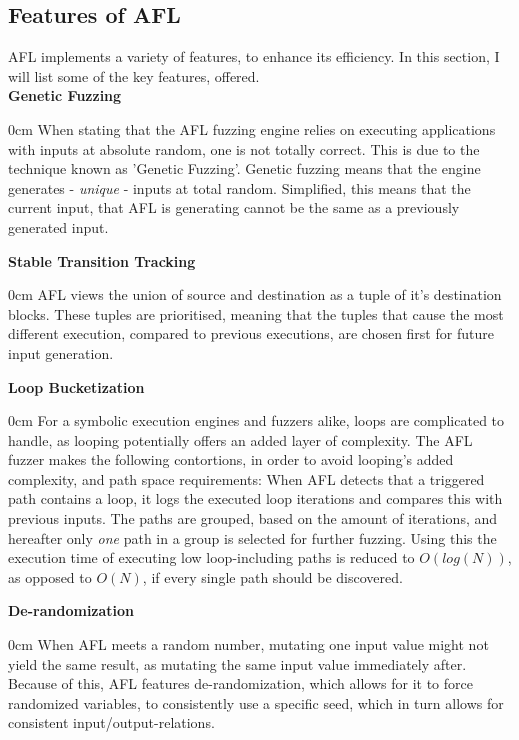 \documentclass[a4paper]{article}
\newcommand{\tbf}[1]{\textbf{#1}}
\newcommand{\tit}[1]{\textit{#1}}
\newcommand{\marginwidth}{0.5cm}
\newcommand{\subsubsubsection}[1]{\tbf{#1}\begin{addmargin}[\marginwidth]{0cm}}
\begin{document}
\subsection{Features of AFL}
\label{sec:FeaturesAFL}
AFL implements a variety of features, to enhance its efficiency. In this section, I will list some of the key features, offered.\\
\subsubsubsection{Genetic Fuzzing}
When stating that the AFL fuzzing engine relies on executing applications with inputs at absolute random, one is not totally correct. This is due to the technique known as 'Genetic Fuzzing'. Genetic fuzzing means that the engine generates - \tit{unique} - inputs at total random. Simplified, this means that the current input, that AFL is generating cannot be the same as a previously generated input.
\end{addmargin}
\subsubsubsection{Stable Transition Tracking}
AFL views the union of source and destination as a tuple of it's destination blocks. These tuples are prioritised, meaning that the tuples that cause the most different execution, compared to previous executions, are chosen first for future input generation.
\end{addmargin}
\subsubsubsection{Loop Bucketization}
For a symbolic execution engines and fuzzers alike, loops are complicated to handle, as looping potentially offers an added layer of complexity. The AFL fuzzer makes the following contortions, in order to avoid looping's added complexity, and path space requirements:
When AFL detects that a triggered path contains a loop, it logs the executed loop iterations and compares this with previous inputs. The paths are grouped, based on the amount of iterations, and hereafter only \tit{one} path in a group is selected for further fuzzing. Using this the execution time of executing low loop-including paths is reduced to $O(log(N))$, as opposed to $O(N)$, if every single path should be discovered.
\end{addmargin}
\subsubsubsection{De-randomization}
When AFL meets a random number, mutating one input value might not yield the same result, as mutating the same input value immediately after. Because of this, AFL features de-randomization, which allows for it to force randomized variables, to consistently use a specific seed, which in turn allows for consistent input/output-relations.
\end{addmargin}
\newpage
\end{document}
